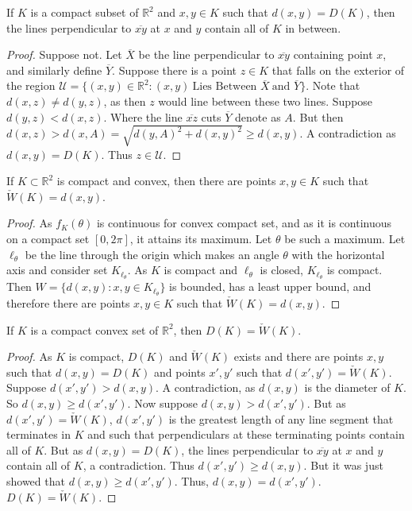 \documentclass[crop=false,class=book,oneside]{standalone}
\begin{document}
            \begin{lemma}
            If $K$ is a compact subset of $\mathbb{R}^2$ and $x,y\in K$ such that $d(x,y)=D(K)$, then the lines perpendicular to $\overline{xy}$ at $x$ and $y$ contain all of $K$ in between.
            \end{lemma}
            \begin{proof}
            Suppose not. Let $\overline{X}$ be the line perpendicular to $\overline{xy}$ containing point $x$, and similarly define $\overline{Y}$. Suppose there is a point $z\in K$ that falls on the exterior of the region $\mathcal{U} = \{(x,y)\in \mathbb{R}^2: (x,y)\ \textrm{Lies Between } \overline{X}\ \textrm{and } \overline{Y}\}$. Note that $d(x,z)\ne d(y,z)$, as then $z$ would line between these two lines. Suppose $d(y,z)<d(x,z)$. Where the line $\overline{xz}$ cuts $\overline{Y}$ denote as $A$. But then $d(x,z) > d(x,A) = \sqrt{d(y,A)^2+d(x,y)^2}\geq d(x,y)$. A contradiction as $d(x,y) = D(K)$. Thus $z\in \mathcal{U}$.
            \end{proof}
            \begin{theorem}
            If $K\subset \mathbb{R}^2$ is compact and convex, then there are points $x,y\in K$ such that $\check{W}(K)=d(x,y)$.
            \end{theorem}
            \begin{proof}
            As $f_K(\theta)$ is continuous for convex compact set, and as it is continuous on a compact set $[0,2\pi]$, it attains its maximum. Let $\theta$ be such a maximum. Let $\ell_{\theta}$ be the line through the origin which makes an angle $\theta$ with the horizontal axis and consider set $K_{\ell_{\theta}}$. As $K$ is compact and $\ell_{\theta}$ is closed, $K_{\ell_{\theta}}$ is compact. Then $W=\{d(x,y):x,y\in K_{\ell_{\theta}}\}$ is bounded, has a least upper bound, and therefore there are points $x,y \in K$ such that $\check{W}(K)=d(x,y)$.
            \end{proof}
            \begin{theorem}
            If $K$ is a compact convex set of $\mathbb{R}^2$, then $D(K) = \check{W}(K)$.
            \end{theorem}
            \begin{proof}
            As $K$ is compact, $D(K)$ and $\check{W}(K)$ exists and there are points $x,y$ such that $d(x,y) = D(K)$ and points $x',y'$ such that $d(x',y') = \check{W}(K)$. Suppose $d(x',y')> d(x,y)$. A contradiction, as $d(x,y)$ is the diameter of $K$. So $d(x,y) \geq d(x',y')$. Now suppose $d(x,y)>d(x',y')$. But as $d(x',y')= \check{W}(K)$, $d(x',y')$ is the greatest length of any line segment that terminates in $K$ and such that perpendiculars at these terminating points contain all of $K$. But as $d(x,y)=D(K)$, the lines perpendicular to $\overline{xy}$ at $x$ and $y$ contain all of $K$, a contradiction. Thus $d(x',y') \geq d(x,y)$. But it was just showed that $d(x,y)\geq d(x',y')$. Thus, $d(x,y) = d(x',y')$. $D(K) = \check{W}(K)$.
            \end{proof}
\end{document}
